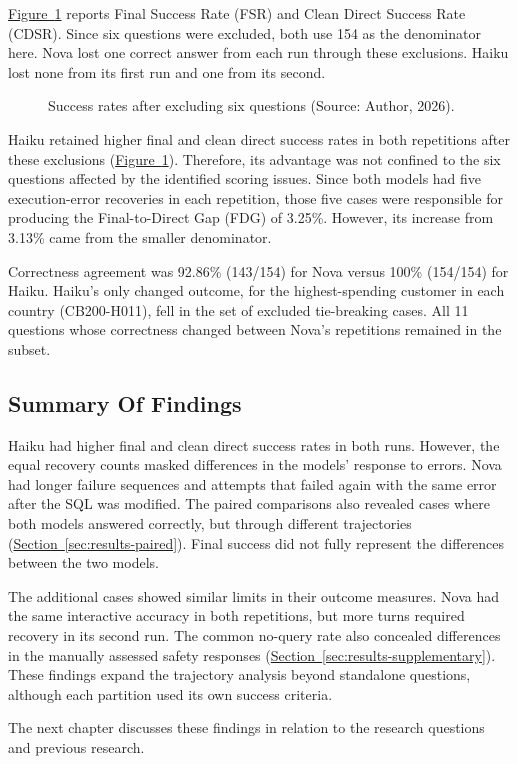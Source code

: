 \hyperref[fig:results-sensitivity]{Figure~\ref*{fig:results-sensitivity}}
reports Final Success Rate (FSR) and Clean Direct Success Rate (CDSR).
Since six questions were excluded, both use 154 as the denominator here. 
Nova lost one correct answer from each run through these exclusions.
Haiku lost none from its first run and one from its second.

\begin{figure}[H]
\centering

\caption{Success rates after excluding six questions (Source: Author, 2026).}
\label{fig:results-sensitivity}
\end{figure}

Haiku retained higher final and clean direct success rates in both repetitions
after these exclusions
(\hyperref[fig:results-sensitivity]{Figure~\ref*{fig:results-sensitivity}}). 
Therefore, its advantage was not confined to the six questions affected by the identified
scoring issues.
Since both models had five execution-error recoveries in each repetition, 
those five cases were responsible for producing the Final-to-Direct Gap (FDG) of 3.25\%. 
However, its increase from 3.13\% came from the smaller denominator. 

Correctness agreement was 92.86\% (143/154) for Nova versus 100\% (154/154) for Haiku. 
Haiku's only changed outcome, for the highest-spending customer in each country (CB200-H011), 
fell in the set of excluded tie-breaking cases. 
All 11 questions whose correctness changed between Nova's repetitions remained in the subset. 

\subsection{Summary Of Findings}
\label{sec:results-summary}

Haiku had higher final and clean direct success rates in both runs.
However, the equal recovery counts masked differences in the models'
response to errors. 
Nova had longer failure sequences and attempts that failed again
with the same error after the SQL was modified.
The paired comparisons also revealed cases where both models answered
correctly, but through different trajectories
(\hyperref[sec:results-paired]{Section~\ref*{sec:results-paired}}).
Final success did not fully represent
the differences between the two models.

The additional cases showed similar limits in their outcome measures.
Nova had the same interactive accuracy in both repetitions, but more turns required recovery
in its second run. The common no-query rate also concealed differences in the
manually assessed safety responses
(\hyperref[sec:results-supplementary]{Section~\ref*{sec:results-supplementary}}).
These findings expand the trajectory analysis beyond standalone questions,
although each partition used its own success criteria.

The next chapter discusses these findings in relation to the research questions and previous research.
